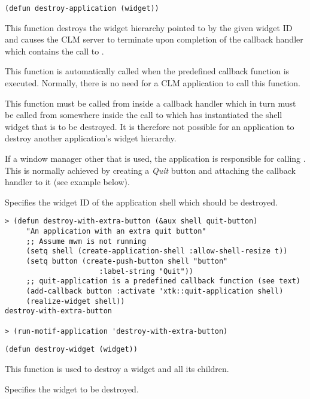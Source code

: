\begin{lispd}
\syntax\begin{verbatim}
(defun destroy-application (widget))
\end{verbatim}

\beschr This function destroys the widget hierarchy pointed to by the given
widget ID and causes the CLM server to terminate upon completion of the
callback handler which contains the call to .

\hinweis This function is automatically called when the predefined callback
function  is executed. Normally, there is no need for a
CLM application to call this function.

This function must be called from inside a callback handler which in turn must
be called from somewhere inside the call to  which
has instantiated the shell widget that is to be destroyed. It is therefore
not possible for an application to destroy another application's widget 
hierarchy.

If a window manager other that  is used, the application is
responsible for calling .  This is normally achieved
by creating a {\it Quit} button and attaching the callback handler
 to it (see example below). 

\parameter
\begin{paramd}
 Specifies the widget ID of the application shell which should
be destroyed.
\end{paramd}
\beispiel\begin{verbatim}
> (defun destroy-with-extra-button (&aux shell quit-button)
     "An application with an extra quit button"
     ;; Assume mwm is not running
     (setq shell (create-application-shell :allow-shell-resize t))
     (setq button (create-push-button shell "button"
				      :label-string "Quit"))
     ;; quit-application is a predefined callback function (see text)
     (add-callback button :activate 'xtk::quit-application shell)
     (realize-widget shell))
destroy-with-extra-button

> (run-motif-application 'destroy-with-extra-button)
\end{verbatim}
\end{lispd}

\begin{lispd}
\syntax\begin{verbatim}
(defun destroy-widget (widget))
\end{verbatim}
\beschr This function is used to destroy a widget and all its children.
\parameter
\begin{paramd}
 Specifies the widget to be destroyed.
\end{paramd}
\end{lispd}

